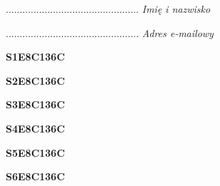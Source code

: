 \begin{turn}{90}\begin{minipage}{\linewidth} \vspace{20mm} ................................................  \textit{Imię i nazwisko}\end{minipage}\end{turn}

\begin{turn}{90}\begin{minipage}{\linewidth} \vspace{20mm} ................................................  \textit{Adres e-mailowy}\end{minipage}\end{turn}

\begin{turn}{90}\huge \begin{minipage}{\linewidth} \vspace{10mm}\textbf{S1E8C136C}\end{minipage}\end{turn}

\begin{turn}{90}\huge \begin{minipage}{\linewidth} \vspace{10mm}\textbf{S2E8C136C}\end{minipage}\end{turn}

\begin{turn}{90}\huge \begin{minipage}{\linewidth} \vspace{10mm}\textbf{S3E8C136C}\end{minipage}\end{turn}

\begin{turn}{90}\huge \begin{minipage}{\linewidth} \vspace{10mm}\textbf{S4E8C136C}\end{minipage}\end{turn}

\begin{turn}{90}\huge \begin{minipage}{\linewidth} \vspace{10mm}\textbf{S5E8C136C}\end{minipage}\end{turn}

\begin{turn}{90}\huge \begin{minipage}{\linewidth} \vspace{10mm}\textbf{S6E8C136C}\end{minipage}\end{turn}

